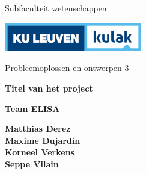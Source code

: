 \documentclass{article}
\title{%
                                              }
\author{%
                                                               }
\date{}
\begin{document}
\pagestyle{empty}

\begin{center}
	{{\Large Subfaculteit wetenschappen}
	
	\vspace{1cm}
	
	\includegraphics[width=6cm]{2013-kulak-cmyk-highres.jpg}
	
	\vspace{1cm}
	
	\Large Probleemoplossen en ontwerpen 3}
	
	\vspace{2cm}

	{\Huge \textbf{Titel van het project}}
	
	\vspace{1cm}
	
	{\Large \textbf{Team ELISA}}
	
	\vspace{1cm}
	
	{\Large \textbf{Matthias Derez}}\\
	{\Large \textbf{Maxime Dujardin}}\\
	{\Large \textbf{Korneel Verkens}}\\
	{\Large \textbf{Seppe Vilain}}\\

\end{center}
\end{document}
